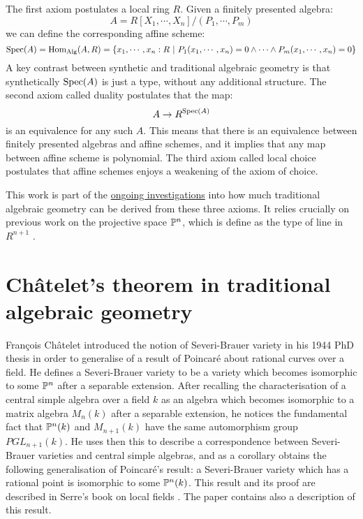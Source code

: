 \documentclass{../util/zariski}
\begin{document}
The first axiom postulates a local ring $R$. Given a finitely presented algebra:
\[A = R[X_1,\cdots,X_n]/(P_1,\cdots,P_m)\]
we can define the corresponding affine scheme:
\[\operatorname{Spec}(A) = \mathrm{Hom}_{\mathrm{Alg}}(A,R) = \{x_1,\cdots,x_n:R\ |\ P_1(x_1,\cdots,x_n) = 0 \land\cdots\land P_m(x_1,\cdots,x_n) = 0\}\] 
A key contrast between synthetic and traditional algebraic geometry is that synthetically $\operatorname{Spec}(A)$ is just a type, without any additional structure. The second axiom called duality postulates that the map:
\[A\to R^{\operatorname{Spec}(A)}\]
is an equivalence for any such $A$. This means that there is an equivalence between finitely presented algebras and affine schemes, and it implies that any map between affine scheme is polynomial. The third axiom called local choice postulates that affine schemes enjoys a weakening of the axiom of choice.

This work is part of the \href{https://github.com/felixwellen/synthetic-zariski/blob/main/README.md}{ongoing investigations} into how much traditional algebraic geometry can be derived from these three axioms. It relies crucially on previous work on the projective space $\mathbb{P}^n$, which is define as the type of line in $R^{n+1}$ \cite{sag-projective}.


\section{Ch\^atelet's theorem in traditional algebraic geometry}

{F}ran\c cois {C}h\^atelet introduced the notion of Severi-Brauer variety in his 1944 PhD thesis
\cite{chatelet44} in order to generalise of a result of Poincar\'e about rational curves over a field.
He defines a Severi-Brauer variety to be a variety which becomes isomorphic to some $\mathbb{P}^n$ after
a separable extension. After recalling the characterisation of a central simple algebra over a field $k$ as
an algebra which becomes isomorphic to a matrix algebra $M_n(k)$ after a separable extension, he notices the fundamental
fact that $\mathbb{P}^{n}(k)$ and $M_{n+1}(k)$ have the same automorphism group $PGL_{n+1}(k)$. He uses then this
to describe a correspondence between Severi-Brauer varieties and central simple algebras, and as a corollary
obtains the following generalisation of Poincar\'e's result: a Severi-Brauer variety which has a rational point
is isomorphic to some $\mathbb{P}^{n}(k)$. This result and its proof are described in Serre's book on local fields \cite{serre62}.
The paper \cite{colliot88} contains also a description of this result.
\end{document}
